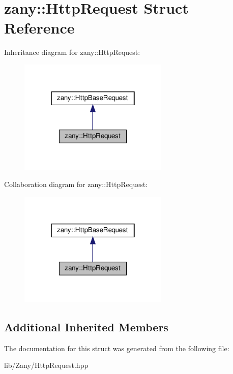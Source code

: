 \hypertarget{structzany_1_1_http_request}{}\section{zany\+:\+:Http\+Request Struct Reference}
\label{structzany_1_1_http_request}


Inheritance diagram for zany\+:\+:Http\+Request\+:
\nopagebreak
\begin{figure}[H]
\begin{center}
\leavevmode
\includegraphics[width=202pt]{structzany_1_1_http_request__inherit__graph}
\end{center}
\end{figure}


Collaboration diagram for zany\+:\+:Http\+Request\+:
\nopagebreak
\begin{figure}[H]
\begin{center}
\leavevmode
\includegraphics[width=202pt]{structzany_1_1_http_request__coll__graph}
\end{center}
\end{figure}
\subsection*{Additional Inherited Members}


The documentation for this struct was generated from the following file\+:\begin{DoxyCompactItemize}
\item 
lib/\+Zany/Http\+Request.\+hpp\end{DoxyCompactItemize}
